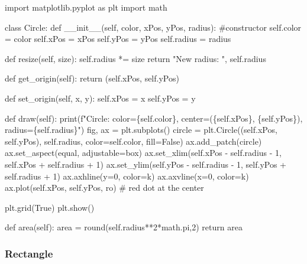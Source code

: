 \documentclass[
]{article}
\newenvironment{Shaded}{\begin{snugshade}}{\end{snugshade}}
\newcommand{\NormalTok}[1]{\textcolor[rgb]{0.00,0.23,0.31}{#1}}
\begin{document}
\begin{Shaded}
\begin{Highlighting}[]
\NormalTok{import matplotlib.pyplot as plt}
\NormalTok{import math}

\NormalTok{class Circle:}
\NormalTok{    def \_\_init\_\_(self, color, xPos, yPos, radius): \#constructor}
\NormalTok{        self.color = color}
\NormalTok{        self.xPos = xPos}
\NormalTok{        self.yPos = yPos}
\NormalTok{        self.radius = radius}

\NormalTok{    def resize(self, size):}
\NormalTok{        self.radius *= size}
\NormalTok{        return "New radius: ", self.radius}
    
\NormalTok{    def get\_origin(self):}
\NormalTok{        return (self.xPos, self.yPos)}

\NormalTok{    def set\_origin(self, x, y):}
\NormalTok{        self.xPos = x}
\NormalTok{        self.yPos = y}

\NormalTok{    def draw(self):}
\NormalTok{        print(f"Circle: color=\{self.color\}, center=(\{self.xPos\}, \{self.yPos\}), radius=\{self.radius\}")}
\NormalTok{        fig, ax = plt.subplots()}
\NormalTok{        circle = plt.Circle((self.xPos, self.yPos), self.radius, color=self.color, fill=False)}
\NormalTok{        ax.add\_patch(circle)}
\NormalTok{        ax.set\_aspect(\textquotesingle{}equal\textquotesingle{}, adjustable=\textquotesingle{}box\textquotesingle{})}
\NormalTok{        ax.set\_xlim(self.xPos {-} self.radius {-} 1, self.xPos + self.radius + 1)}
\NormalTok{        ax.set\_ylim(self.yPos {-} self.radius {-} 1, self.yPos + self.radius + 1)}
\NormalTok{        ax.axhline(y=0, color=\textquotesingle{}k\textquotesingle{})}
\NormalTok{        ax.axvline(x=0, color=\textquotesingle{}k\textquotesingle{})}
\NormalTok{        ax.plot(self.xPos, self.yPos, \textquotesingle{}ro\textquotesingle{})  \# red dot at the center}
        
\NormalTok{        plt.grid(True)}
\NormalTok{        plt.show()}

\NormalTok{    def area(self):}
\NormalTok{        area = round(self.radius**2*math.pi,2)}
\NormalTok{        return area}
\end{Highlighting}
\end{Shaded}

\subsubsection{Rectangle}\label{rectangle}
\end{document}
